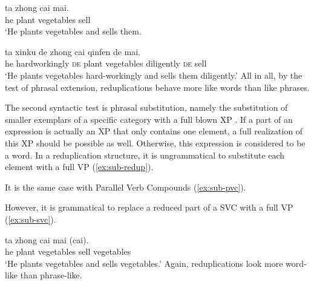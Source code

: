 \ea
  \ea\label{ex:ext-svc1}
  \gll ta zhong cai mai.\\
  he plant vegetables sell\\
  \glt `He plants vegetables and sells them.
  
  \ex\label{ex:ext-svc2}
  \gll ta xinku de zhong cai qinfen de mai.\\
  he hardworkingly \textsc{de} plant vegetables diligently \textsc{de} sell\\
  \glt `He plants vegetables hard-workingly and sells them diligently.'
  \z
\z
All in all, by the test of phrasal extension, reduplications behave more like words than like phrases.



The second syntactic test is phrasal substitution, namely the substitution of smaller exemplars of a specific category with a full blown XP \citetext{\citealp[152]{Duanmu1998}; \citealp[280]{Schaefer2009}}. 
If a part of an expression is actually an XP that only contains one element, a full realization of this XP should be possible as well.
Otherwise, this expression is considered to be a word.
In a reduplication structure, it is ungrammatical to substitute each element with a full {VP} (\ref{ex:sub-redup}).

\ea\label{ex:sub-redup}
    
  \z
\z

It is the same case with Parallel Verb Compounds (\ref{ex:sub-pvc}).

\label{ex:sub-pvc}
\z

However, it is grammatical to replace a reduced part of a {SVC} with a full VP (\ref{ex:sub-svc}).

\ea\label{ex:sub-svc}
\gll ta zhong cai mai (cai).\\
 he plant vegetables sell vegetables\\
\glt `He plants vegetables and sells vegetables.'
 \z
Again, reduplications look more word-like than phrase-like.


